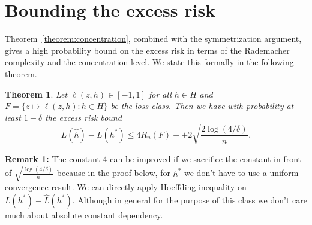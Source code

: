 \documentclass[11pt]{article}
\newtheorem{theorem}{Theorem}
\begin{document}
\section{Bounding the excess risk}
Theorem~\ref{theorem:concentration}, combined with the symmetrization argument, gives a high probability bound on the excess risk in terms of the Rademacher complexity and the concentration level. We state this formally in the following theorem.
\begin{theorem}
  Let $\ell(z,h)\in[-1,1]$ for all $h\in H$ and $F=\{z\mapsto \ell(z,h):h\in H\}$ be the loss class. Then we have with probability at least $1-\delta$ the excess risk bound
  \begin{equation}
    L(\hat{h}) - L(h^*) \le 4R_n(F) + + 2\sqrt{\frac{2\log(4/\delta)}{n}}.
  \end{equation}
\end{theorem}

{\bf Remark 1: } The constant 4 can be improved if we sacrifice the constant in front of $\sqrt{\frac{\log(4/\delta)}{n}}$ because in the proof below, for $h^*$ we don't have to use a uniform convergence result. We can directly apply Hoeffding inequality on $L(h^*) - \hat{L}(h^*)$. Although in general for the purpose of this class we don't care much about absolute constant dependency. 
\end{document}

